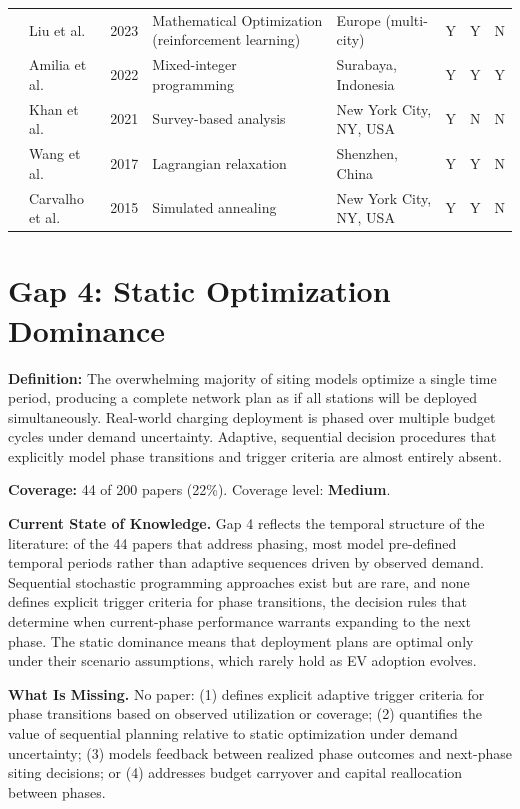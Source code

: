 \documentclass[letterpaper, 12pt, oneside, doublespacing]{Thesis}
\begin{document}
\begin{longtable}{L{0.9cm} L{1.8cm} L{0.7cm} L{2.5cm} L{2.1cm} L{0.7cm} L{0.7cm} L{0.7cm}}
\cite{optimal_placement_2023} & Liu et al. & 2023 & Mathematical Optimization (reinforcement learning) & Europe (multi-city) & Y & Y & N \\
\cite{designing_an_2022} & Amilia et al. & 2022 & Mixed-integer programming & Surabaya, Indonesia & Y & Y & Y \\
\cite{inequitable_access_2021} & Khan et al. & 2021 & Survey-based analysis & New York City, NY, USA & Y & N & N \\
\cite{electrical_vehicle_2017} & Wang et al. & 2017 & Lagrangian relaxation & Shenzhen, China & Y & Y & N \\
\cite{critical_behaviour_2015} & Carvalho et al. & 2015 & Simulated annealing & New York City, NY, USA & Y & Y & N \\
\bottomrule
\end{longtable}


\section{Gap 4: Static Optimization Dominance}


\noindent \textbf{Definition:} The overwhelming majority of siting models optimize a single time period, producing a complete network plan as if all stations will be deployed simultaneously. Real-world charging deployment is phased over multiple budget cycles under demand uncertainty. Adaptive, sequential decision procedures that explicitly model phase transitions and trigger criteria are almost entirely absent.



\noindent \textbf{Coverage:} 44 of 200 papers (22\%). Coverage level: \textbf{Medium}.



\noindent \textbf{Current State of Knowledge.} Gap 4 reflects the temporal structure of the literature: of the 44 papers that address phasing, most model pre-defined temporal periods rather than adaptive sequences driven by observed demand. Sequential stochastic programming approaches exist but are rare, and none defines explicit trigger criteria for phase transitions, the decision rules that determine when current-phase performance warrants expanding to the next phase. The static dominance means that deployment plans are optimal only under their scenario assumptions, which rarely hold as EV adoption evolves.



\noindent \textbf{What Is Missing.} No paper: (1) defines explicit adaptive trigger criteria for phase transitions based on observed utilization or coverage; (2) quantifies the value of sequential planning relative to static optimization under demand uncertainty; (3) models feedback between realized phase outcomes and next-phase siting decisions; or (4) addresses budget carryover and capital reallocation between phases.
\end{document}
